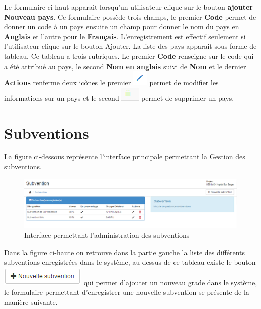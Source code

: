 \documentclass[12pt,a4paper]{report}
\begin{document}
Le formulaire ci-haut apparait lorsqu'un utilisateur clique sur le bouton \textbf{ajouter Nouveau pays}. Ce formulaire possède trois champs, le premier \textbf{Code} permet de donner un code à un pays ensuite un champ pour donner le nom du pays en \textbf{Anglais} et l'autre pour le \textbf{Français}.
L'enregistrement est effectif seulement si l'utilisateur clique sur le bouton Ajouter. La liste des pays apparait sous forme de tableau. Ce tableau a trois rubriques. Le premier \textbf{Code} renseigne sur le code qui a été attribué au pays, le second \textbf{Nom en anglais} suivi de \textbf{Nom}  et le dernier \textbf{Actions} renferme deux icônes le premier \includegraphics[scale=0.7]{pic/EditUser.png}  permet de modifier les informations sur un pays et le second \includegraphics[scale=0.7]{pic/DeleteWRed.png}  permet de supprimer un pays.


\section{Subventions}
La figure ci-dessous représente l'interface principale permettant la Gestion des subventions. 
\begin{figure}[h]
\begin{center}
\includegraphics[width=12cm]{pic/MainSubvention.png}
\end{center}
\caption{Interface permettant l'administration des subventions}
\label{Interface permettant l'administration des subventions}
\end{figure}

Dans la figure ci-haute on retrouve dans la partie gauche la liste des différents subventions enregistrées dans le système, au dessus de ce tableau existe le bouton \includegraphics[scale=1]{pic/NewSubvention.png} qui permet d'ajouter un nouveau grade dans le système, le formulaire permettant d'enregistrer une nouvelle subvention se présente de la manière suivante.
\end{document}
